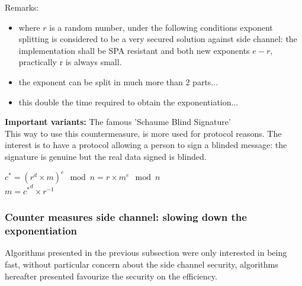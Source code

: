 \begin{itemize}
		Remarks:
		\begin{itemize}
			\item where $r$ is a random number, under the following conditions 
			exponent splitting is considered to be a very secured solution against 
			side channel: the implementation shall be SPA resistant and both new 
			exponents $e - r$, practically r is always small.
			\item the exponent can be split in much more than 2 parts...
			\item this double the time required to obtain the exponentiation...
		\end{itemize}

		\textbf{Important variants:} The famous 'Schaume Blind Signature'\\
This way to use this countermeasure, is more used for protocol reasons.
The interest is to have a protocol allowing a person to sign a blinded message:
the signature is genuine but the real data signed is blinded.
\begin{center}
$c^{\ast} = (r^d \times m )^{ e } \mod n = r \times m ^{ e } \mod n $\\
$m = {c^{\ast}}^d  \times  r^{-1}$
\end{center}

\end{itemize}

\subsubsection{Counter measures side channel: slowing down the exponentiation}
Algorithms presented in the previous subsection were only interested in being fast,
without particular concern about the side channel security, algorithms hereafter 
presented favourize the security on the efficiency.


